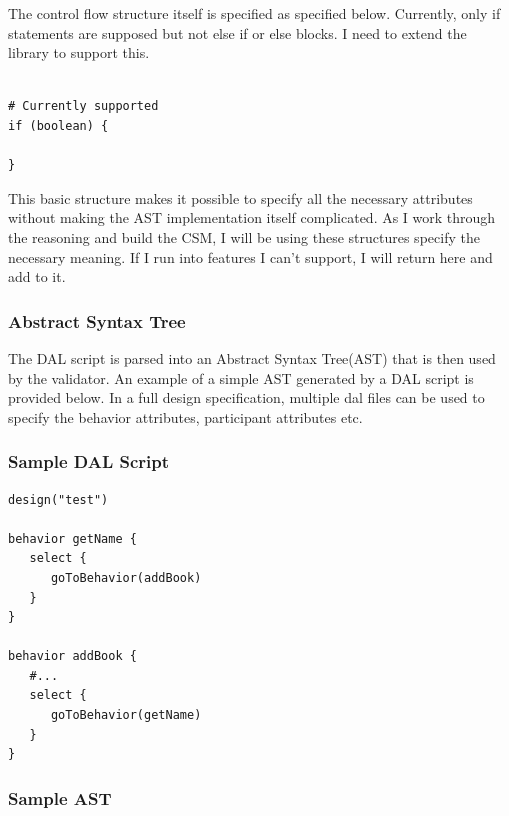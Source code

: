 The control flow structure itself is specified as specified below. Currently, only if statements are supposed but not else if or else blocks. I need to extend the library to support this.

\begin{verbatim}

# Currently supported
if (boolean) {
    
}
\end{verbatim}

This basic structure makes it possible to specify all the necessary attributes without making the AST implementation itself complicated. As I work through the reasoning and build the CSM, I will be using these structures specify the necessary meaning. If I run into features I can't support, I will return here and add to it. 

\subsubsection{Abstract Syntax Tree}

The DAL script is parsed into an Abstract Syntax Tree(AST) that is then used by the validator. An example of a simple AST generated by a DAL script is provided below. In a full design specification, multiple dal files can be used to specify the behavior attributes, participant attributes etc. 

\subsubsection{Sample DAL Script}
\begin{verbatim}
design("test")

behavior getName {
   select {
      goToBehavior(addBook)
   }
}

behavior addBook {
   #...
   select {
      goToBehavior(getName)
   }
}

\end{verbatim}

\subsubsection{Sample AST}

